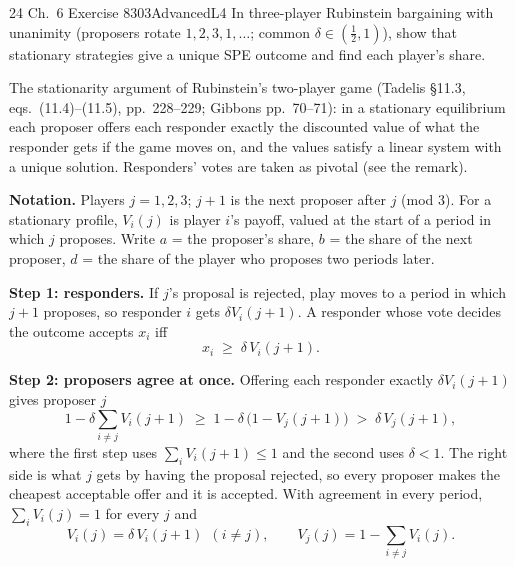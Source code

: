 \begin{exsol}{24}{\MG{} Ch.~6 Exercise 8}{303}{Advanced}{L4}
\asked In three-player Rubinstein bargaining with unanimity (proposers rotate $1, 2, 3, 1, \dots$;
common $\delta \in (\frac12, 1)$), show that stationary strategies give a unique SPE outcome and find
each player's share.

\method The stationarity argument of Rubinstein's two-player game (Tadelis \S11.3, eqs.~(11.4)--(11.5),
pp.~228--229; Gibbons pp.~70--71): in a stationary equilibrium each proposer offers each responder
exactly the discounted value of what the responder gets if the game moves on, and the values
satisfy a linear system with a unique solution. Responders' votes are taken as pivotal (see the remark).

\solution
\textbf{Notation.} Players $j = 1, 2, 3$; $j+1$ is the next proposer after $j$ (mod 3). For a
stationary profile, $V_i(j)$ is player $i$'s payoff, valued at the start of a period in which $j$
proposes. Write $a$ = the proposer's share, $b$ = the share of the next proposer, $d$ = the share of
the player who proposes two periods later.

\textbf{Step 1: responders.} If $j$'s proposal is rejected, play moves to a period in which $j+1$
proposes, so responder $i$ gets $\delta V_i(j+1)$. A responder whose vote decides the outcome
accepts $x_i$ iff
\begin{equation}
  x_i \;\ge\; \delta\, V_i(j+1). \label{eq:24acc}
\end{equation}

\textbf{Step 2: proposers agree at once.} Offering each responder exactly
$\delta V_i(j+1)$ gives proposer $j$
\[
  1 - \delta \sum_{i \ne j} V_i(j+1) \;\ge\; 1 - \delta\,\bigl(1 - V_j(j+1)\bigr)
  \;>\; \delta\, V_j(j+1),
\]
where the first step uses $\sum_i V_i(j+1) \le 1$ and the second uses $\delta < 1$. The right side is
what $j$ gets by having the proposal rejected, so every proposer makes the cheapest acceptable
offer and it is accepted. With agreement in every period, $\sum_i V_i(j) = 1$ for every $j$ and
\begin{equation}
  V_i(j) = \delta\, V_i(j+1)\ \ (i \ne j), \qquad V_j(j) = 1 - \sum_{i\ne j} V_i(j). \label{eq:24sys}
\end{equation}


\end{exsol}
